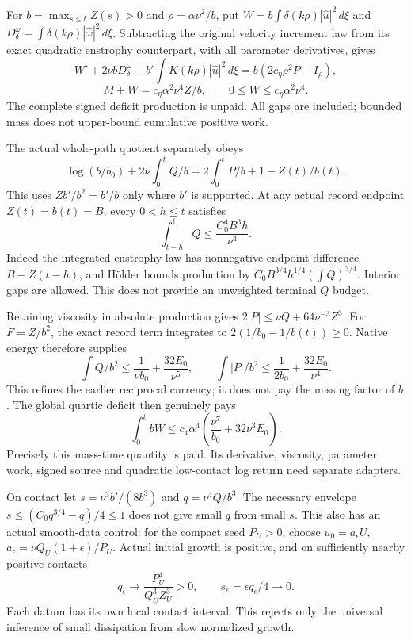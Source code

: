\documentclass[11pt]{article}
\begin{document}
For $b=\max_{s\le t}Z(s)>0$ and $\rho=\alpha\nu^2/b$, put
$W=b\int\delta(k\rho)|\widehat u|^2\,d\xi$ and
$D^\omega_\delta=\int\delta(k\rho)|\widehat\omega|^2\,d\xi$.
Subtracting the original velocity increment law from its exact quadratic
enstrophy counterpart, with all parameter derivatives, gives
\[
 W'+2\nu bD^\omega_\delta+b'\int K(k\rho)|\widehat u|^2\,d\xi
 =b(2c_\eta\rho^2P-I_\rho),
\]
\[
 M+W=c_\eta\alpha^2\nu^4 Z/b,
 \qquad0\le W\le c_\eta\alpha^2\nu^4.
\]
The complete signed deficit production is unpaid. All gaps are included;
bounded mass does not upper-bound cumulative positive work.

The actual whole-path quotient separately obeys
\[
 \log(b/b_0)+2\nu\int_0^t Q/b
 =2\int_0^t P/b+1-Z(t)/b(t).
\]
This uses $Zb'/b^2=b'/b$ only where $b'$ is supported. At any actual
record endpoint $Z(t)=b(t)=B$, every $0<h\le t$ satisfies
\[
 \int_{t-h}^t Q\le\frac{C_0^4B^3h}{\nu^4}.
\]
Indeed the integrated enstrophy law has nonnegative endpoint difference
$B-Z(t-h)$, and H\"older bounds production by
$C_0B^{3/4}h^{1/4}(\int Q)^{3/4}$. Interior gaps are allowed. This
does not provide an unweighted terminal $Q$ budget.

Retaining viscosity in absolute production gives
$2|P|\le\nu Q+64\nu^{-3}Z^3$.
For $F=Z/b^2$, the exact record term integrates to
$2(1/b_0-1/b(t))\ge0$. Native energy therefore supplies
\[
 \int Q/b^2\le\frac1{\nu b_0}+\frac{32E_0}{\nu^5},\qquad
 \int |P|/b^2\le\frac1{2b_0}+\frac{32E_0}{\nu^4}.
\]
This refines the earlier reciprocal currency; it does not pay the missing
factor of $b$. The global quartic deficit then genuinely pays
\[
 \int_0^t bW\le c_4\alpha^4\left(\frac{\nu^7}{b_0}+32\nu^3E_0\right).
\]
Precisely this mass-time quantity is paid. Its derivative, viscosity,
parameter work, signed source and quadratic low-contact log return need
separate adapters.

On contact let $s=\nu^3b'/(8b^3)$ and $q=\nu^4Q/b^3$.
The necessary envelope $s\le(C_0q^{3/4}-q)/4\le1$ does not give small
$q$ from small $s$. This also has an actual smooth-data control:
for the compact seed $P_U>0$, choose
$u_0=a_\epsilon U$, $a_\epsilon=\nu Q_U(1+\epsilon)/P_U$.
Actual initial growth is positive, and on sufficiently nearby positive
contacts
\[
 q_\epsilon\longrightarrow\frac{P_U^4}{Q_U^3Z_U^3}>0,
 \qquad s_\epsilon=\epsilon q_\epsilon/4\longrightarrow0.
\]
Each datum has its own local contact interval. This rejects only the
universal inference of small dissipation from slow normalized growth.
\end{document}
